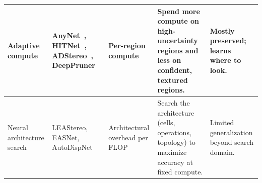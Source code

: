 \begin{table}[!htbp]
\begin{tabular}{p{2.6cm}p{4.0cm}p{2.4cm}p{4.0cm}p{2.6cm}}
\midrule
Adaptive compute &
AnyNet~\cite{wang2019anynet}, HITNet~\cite{tankovich2021hitnet}, ADStereo~\cite{wang2023adstereo}, DeepPruner~\cite{duggal2019deeppruner} &
Per-region compute &
Spend more compute on high-uncertainty regions and less on confident, textured regions. &
Mostly preserved; learns where to look. \\
\midrule
Neural architecture search &
LEAStereo, EASNet, AutoDispNet~\cite{saikia2019autodispnet} &
Architectural overhead per FLOP &
Search the architecture (cells, operations, topology) to maximize accuracy at fixed compute. &
Limited generalization beyond search domain. \\
\bottomrule
\end{tabular}
\end{table}
